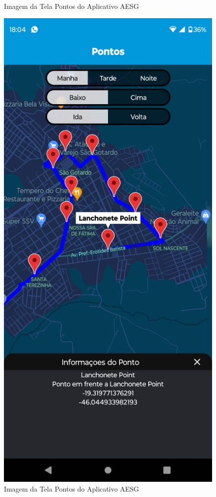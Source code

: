 \documentclass[
    12pt,                   %
    openright,              %
    oneside,                %
    a4paper,                %
    sumario=tradicional,    %
    english,                %
    brazil,                 %
    ]{abntex2}
\begin{document}
\begin{figure}[!h]
\begin{minipage}{0.5\textwidth}
                    \caption[Imagem da Tela Pontos do Aplicativo AESG]{ 
                    Imagem da Tela Pontos do Aplicativo AESG}
                    \label{fig:AppTelaPontos}
                \end{minipage}%
                \begin{minipage}{0.5\textwidth}
                    \centering
                    \includegraphics[width=0.8\linewidth]{Imagens/App Images User/AUPontos2.png}
                    \caption[Imagem da Tela Pontos do Aplicativo AESG]{ 
                    Imagem da Tela Pontos do Aplicativo AESG}
                    \label{fig:AppTelaPontos2}
                \end{minipage}
            \end{figure}
\end{document}
